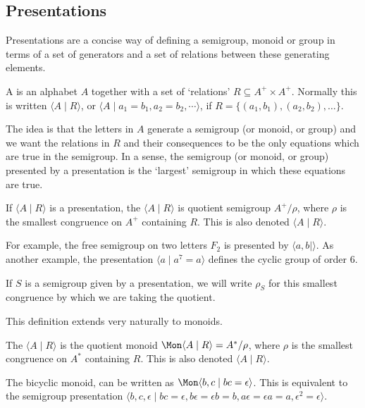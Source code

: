 \documentclass[noindex,noinsetproof,12pt]{lmaths}
\begin{document}
\subsection{Presentations}

Presentations are a concise way of defining a semigroup, monoid or group in terms of a set of generators and a set of relations between these generating elements.

\begin{defn}
	A  is an alphabet $A$ together with a set of `relations' $R \subseteq A^+ \times A^+$. Normally this is written $\langle A \mid R\rangle$, or $\langle A \mid a_1 = b_1, a_2 = b_2, \cdots \rangle$, if $R = \{(a_1, b_1), (a_2, b_2), \ldots\}$.
\end{defn}

The idea is that the letters in $A$ generate a semigroup (or monoid, or group) and we want the relations in $R$ and their consequences to be the only equations which are true in the semigroup. In a sense, the semigroup (or monoid, or group) presented by a presentation is the `largest' semigroup in which these equations are true.

\begin{defn}
	If $\langle A \mid R \rangle$ is a presentation, the  $\langle A \mid R\rangle$ is quotient semigroup $A^+/\rho$, where $\rho$ is the smallest congruence on $A^+$ containing $R$. This is also denoted $\langle A \mid R \rangle$.
\end{defn}

For example, the free semigroup on two letters $F_2$ is presented by $\langle a, b \mid \rangle$. As another example, the presentation $\langle a \mid a^7 = a \rangle$ defines the cyclic group of order 6.

If $S$ is a semigroup given by a presentation, we will write $\rho_S$ for this smallest congruence by which we are taking the quotient.

This definition extends very naturally to monoids.

\begin{defn}
	The  $\langle A \mid R\rangle$ is the quotient monoid $\Mon \langle A \mid R\rangle = A^*/\rho$, where $\rho$ is the smallest congruence on $A^*$ containing $R$. This is also denoted $\langle A \mid R \rangle$.
\end{defn}

\begin{example}
The bicyclic monoid, can be written as $\Mon \langle b, c \mid bc = \epsilon \rangle$. This is equivalent to the semigroup presentation $\langle b, c, \epsilon \mid bc = \epsilon, b\epsilon = \epsilon b = b, a\epsilon = \epsilon a = a, \epsilon^2 = \epsilon \rangle$.
\end{example}
\end{document}
